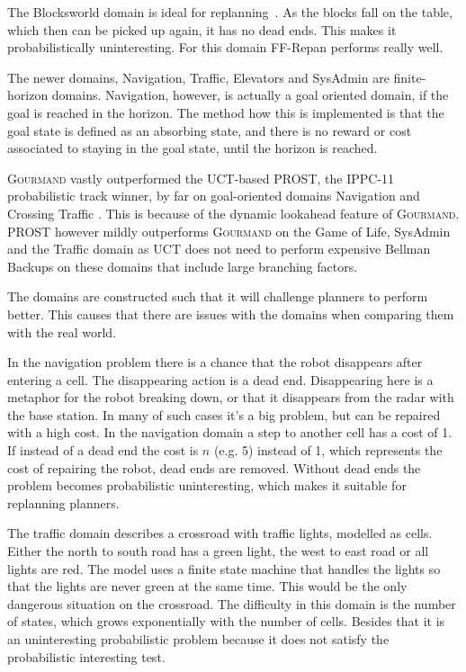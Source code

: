 \documentclass[runningheads,a4paper]{llncs}
\begin{document}
The Blocksworld domain is ideal for
replanning~\cite{FFReplan, little2007probvsreplan}. As the blocks fall on the
table, which then can be picked up again, it has no dead ends. This makes it
probabilistically uninteresting. For this domain FF-Repan performs really well.

The newer  domains, Navigation, Traffic, Elevators and SysAdmin are finite-
horizon domains. Navigation, however, is actually a goal oriented domain, if
the goal is reached in the horizon. The method how this is implemented is that
the goal state is defined as an absorbing state, and there is no reward or cost
associated to staying in the goal state, until the horizon is reached.

\textsc{Gourmand} vastly outperformed the UCT-based PROST, the IPPC-11
probabilistic track winner, by far on goal-oriented domains Navigation and
Crossing Traffic \cite{kolobov2012gourmand}. This is because of the dynamic
lookahead feature of \textsc{Gourmand}. PROST however mildly outperforms
\textsc{Gourmand} on the Game of Life, SysAdmin and the Traffic domain as UCT
does not need to perform expensive Bellman Backups on these domains that
include large branching factors.

The domains are constructed such that it will challenge planners to perform
better. This causes that there are issues with the domains when comparing them
with the real world.

In the navigation problem there is a chance that the robot
disappears after entering a cell. The disappearing action is a dead end.
Disappearing here is a metaphor for the robot breaking down, or that it
disappears from the radar with the base station. In many of such cases it's a
big problem, but can be repaired with a high cost. In the navigation domain a
step to another cell has a cost of 1. If instead of a dead end the cost is $n$
(e.g. 5) instead of 1, which represents the cost of repairing the robot, dead
ends are removed. Without dead ends the problem becomes probabilistic
uninteresting, which makes it suitable for replanning planners.

The traffic domain describes a crossroad with traffic lights, modelled as
cells. Either the north to south road has a green light, the west to east road
or all lights are red. The model uses a finite state machine that handles the
lights so that the lights are never green at the same time. This would be the
only dangerous situation on the crossroad. The difficulty in this domain is
the number of states, which grows exponentially with the number of cells.
Besides that it is an uninteresting probabilistic problem because it does
not satisfy the probabilistic interesting test.
\end{document}

